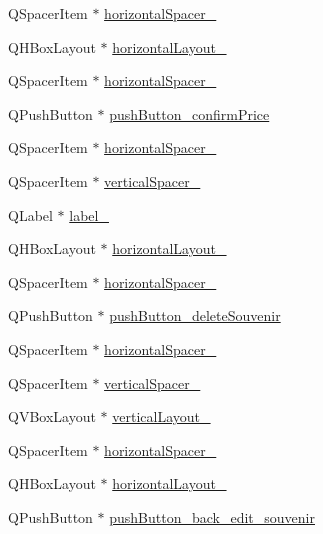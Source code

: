 \begin{DoxyCompactItemize}
\item 
Q\+Spacer\+Item $\ast$ \hyperlink{class_ui___main_window_a9ed08d11cd2d3e8869fec3abf695b2c7}{horizontal\+Spacer\+\_}
\item 
Q\+H\+Box\+Layout $\ast$ \hyperlink{class_ui___main_window_a2071e5a4c77a64f74d74ac246bbc683c}{horizontal\+Layout\+\_}
\item 
Q\+Spacer\+Item $\ast$ \hyperlink{class_ui___main_window_ae11a797bcc3da70f85403a5b15c0d2e7}{horizontal\+Spacer\+\_}
\item 
Q\+Push\+Button $\ast$ \hyperlink{class_ui___main_window_a0e89871f34b8d6a0a89002d973699f95}{push\+Button\+\_\+confirm\+Price}
\item 
Q\+Spacer\+Item $\ast$ \hyperlink{class_ui___main_window_ab0d68dee71dbcd9be2cd4474b18dd0c4}{horizontal\+Spacer\+\_}
\item 
Q\+Spacer\+Item $\ast$ \hyperlink{class_ui___main_window_a0951b55a183ae68dd5b3a8d28e9b9a03}{vertical\+Spacer\+\_}
\item 
Q\+Label $\ast$ \hyperlink{class_ui___main_window_a31fc1e3e6c2d61c1dc50e96b6a60344d}{label\+\_}
\item 
Q\+H\+Box\+Layout $\ast$ \hyperlink{class_ui___main_window_a17c8bb967f8ecc58406ac7ca1bec7b7e}{horizontal\+Layout\+\_}
\item 
Q\+Spacer\+Item $\ast$ \hyperlink{class_ui___main_window_a8aa80b26eac868300d415cb981fca3b4}{horizontal\+Spacer\+\_}
\item 
Q\+Push\+Button $\ast$ \hyperlink{class_ui___main_window_aed558399c37c83dc14fdf27d6f06cf64}{push\+Button\+\_\+delete\+Souvenir}
\item 
Q\+Spacer\+Item $\ast$ \hyperlink{class_ui___main_window_ad4e2fdbb246409d837ec4cf6e74d215f}{horizontal\+Spacer\+\_}
\item 
Q\+Spacer\+Item $\ast$ \hyperlink{class_ui___main_window_ac400d027223f502ec893a175934b68b8}{vertical\+Spacer\+\_}
\item 
Q\+V\+Box\+Layout $\ast$ \hyperlink{class_ui___main_window_aec98c1da19ec397f73ccd25251806b18}{vertical\+Layout\+\_}
\item 
Q\+Spacer\+Item $\ast$ \hyperlink{class_ui___main_window_a2d014d26e5fcd75f277645be825e5167}{horizontal\+Spacer\+\_}
\item 
Q\+H\+Box\+Layout $\ast$ \hyperlink{class_ui___main_window_aa8e5752e2788dc8fd54f14b1bdd4b52c}{horizontal\+Layout\+\_}
\item 
Q\+Push\+Button $\ast$ \hyperlink{class_ui___main_window_a4430f328d3861c79e59e3d10c4a8dd76}{push\+Button\+\_\+back\+\_\+edit\+\_\+souvenir}

\end{DoxyCompactItemize}
